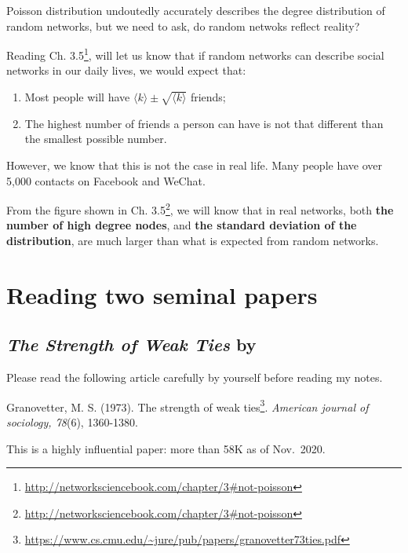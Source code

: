 \documentclass[
]{krantz}
\renewcommand{\href}[2]{#2\footnote{\url{#1}}}
\begin{document}
Poisson distribution undoutedly accurately describes the degree distribution of random networks, but we need to ask, do random netwoks reflect reality?

Reading \href{http://networksciencebook.com/chapter/3\#not-poisson}{Ch. 3.5}, will let us know that if random networks can describe social networks in our daily lives, we would expect that:

\begin{enumerate}
\def\labelenumi{\arabic{enumi}.}
\item
  Most people will have \(\langle k \rangle \pm \sqrt {\langle k \rangle}\) friends;
\item
  The highest number of friends a person can have is not that different than the smallest possible number.
\end{enumerate}

However, we know that this is not the case in real life. Many people have over 5,000 contacts on Facebook and WeChat.

From the figure shown in \href{http://networksciencebook.com/chapter/3\#not-poisson}{Ch. 3.5}, we will know that in real networks, both \textbf{the number of high degree nodes}, and \textbf{the standard deviation of the distribution}, are much larger than what is expected from random networks.

\hypertarget{reading-two-seminal-papers}{%
\section{Reading two seminal papers}\label{reading-two-seminal-papers}}

\hypertarget{the-strength-of-weak-ties-by-granovetter1973strength}{%
\subsection{\texorpdfstring{\emph{The Strength of Weak Ties} by \citet{granovetter1973strength}}{The Strength of Weak Ties by @granovetter1973strength}}\label{the-strength-of-weak-ties-by-granovetter1973strength}}

Please read the following article carefully by yourself before reading my notes.

Granovetter, M. S. (1973). \href{https://www.cs.cmu.edu/~jure/pub/papers/granovetter73ties.pdf}{The strength of weak ties}. \emph{American journal of sociology, 78}(6), 1360-1380.

This is a highly influential paper: more than 58K as of Nov.~2020.
\end{document}
